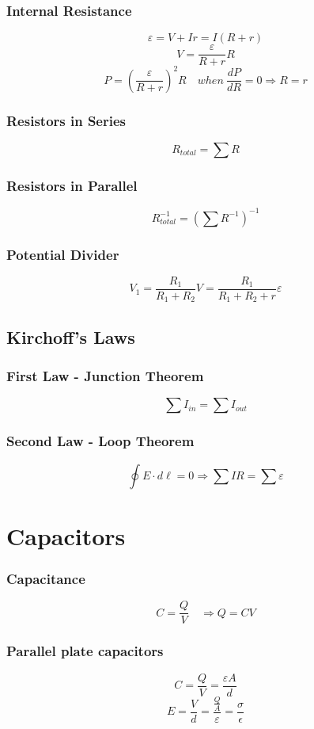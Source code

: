 \documentclass{article}
\begin{document}
\subsubsection*{Internal Resistance}
\[\varepsilon=V+Ir=I(R+r)\]
\[V=\frac{\varepsilon}{R+r}R\]
\[P=\left(\frac{\varepsilon}{R+r}\right)^2R\quad when\ \frac{dP}{dR}=0\Rightarrow R=r\]

\subsubsection*{Resistors in Series}
\[R_{total}=\sum R\]

\subsubsection*{Resistors in Parallel}
\[R_{total}^{-1}=(\sum R^{-1})^{-1}\]

\subsubsection*{Potential Divider}
\[V_1=\frac{R_1}{R_1+R_2}V=\frac{R_1}{R_1+R_2+r}\varepsilon\]

\subsection*{Kirchoff's Laws}
\subsubsection*{First Law - Junction Theorem}
\[\sum I_{in}=\sum I_{out}\]

\subsubsection*{Second Law - Loop Theorem}
\[\oint E\cdot d\ell=0\Rightarrow \sum IR = \sum \varepsilon\]

\section{Capacitors}
\subsubsection*{Capacitance}
\[C=\frac{Q}{V}\quad \Rightarrow Q=CV\]

\subsubsection*{Parallel plate capacitors}
\[C=\frac{Q}{V}=\frac{\varepsilon A}{d}\]
\[E=\frac{V}{d}=\frac{\frac{Q}{A}}{\varepsilon}=\frac{\sigma}{\epsilon}\]
\end{document}
